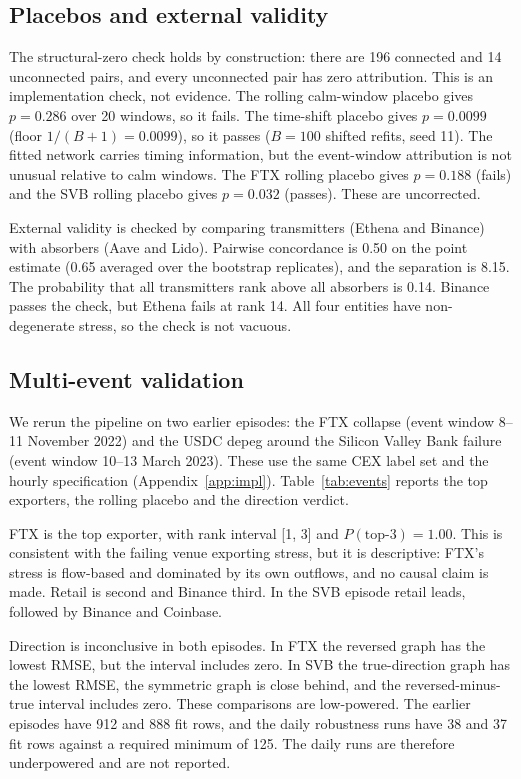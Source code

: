 \documentclass[referee,pdflatex,sn-mathphys-ay]{sn-jnl}
\theoremstyle{thmstyleone}%
\theoremstyle{thmstyletwo}%
\theoremstyle{thmstylethree}%
\begin{document}
\subsection{Placebos and external validity}
\label{subsec:placebo}
The structural-zero check holds by construction: there are
196 connected and 14 unconnected pairs, and every unconnected pair has zero attribution. This is an
implementation check, not evidence. The rolling calm-window placebo gives $p=0.286$ over 20 windows, so it fails.
The time-shift placebo gives $p=0.0099$ (floor $1/(B+1)=0.0099$), so it passes ($B=100$ shifted refits, seed 11). The fitted network carries timing
information, but the event-window attribution is not unusual relative to calm windows. The FTX rolling placebo gives
$p=0.188$ (fails) and the SVB rolling placebo gives $p=0.032$ (passes). These are uncorrected.

External validity is checked by comparing transmitters (Ethena and Binance) with absorbers (Aave and Lido). Pairwise
concordance is 0.50 on the point estimate (0.65 averaged over the bootstrap replicates), and the separation is
8.15. The probability that all transmitters rank above all absorbers is 0.14. Binance passes the check, but Ethena fails
at rank 14. All four entities have non-degenerate stress, so the check is not vacuous.


\subsection{Multi-event validation}
\label{subsec:multievent}
We rerun the pipeline on two earlier episodes: the FTX collapse (event window 8--11 November 2022) and the USDC depeg
around the Silicon Valley Bank failure (event window 10--13 March 2023). These use the same CEX label set and the
hourly specification (Appendix~\ref{app:impl}). Table~\ref{tab:events} reports the top exporters, the rolling placebo and the direction verdict.

FTX is the top exporter, with rank interval [1, 3] and $P(\text{top-3})=1.00$. This is
consistent with the failing venue exporting stress, but it is descriptive: FTX's stress is flow-based and dominated by its own
outflows, and no causal claim is made. Retail is second and Binance third. In the SVB episode retail leads, followed by Binance and Coinbase.

Direction is inconclusive in both episodes. In FTX the reversed graph has the lowest RMSE, but the interval includes zero.
In SVB the true-direction graph has the lowest RMSE, the symmetric graph is close behind, and the reversed-minus-true interval includes zero. These comparisons are low-powered.
The earlier episodes have 912 and 888 fit rows, and the daily robustness runs have 38 and
37 fit rows against a required minimum of 125. The daily runs are therefore underpowered and are not reported.
\end{document}
